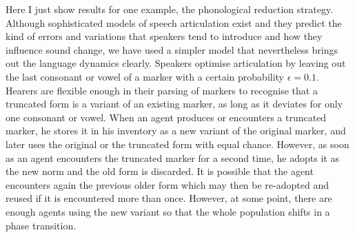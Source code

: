 Here I just show results for one example, the phonological reduction strategy. 
 Although sophisticated models of speech articulation
exist and they predict the kind of errors and variations that speakers tend to introduce and 
how they influence sound change, we have used a simpler model that nevertheless brings out the language dynamics
clearly. Speakers optimise articulation by leaving out the last consonant or vowel of a marker with a certain probability $\epsilon=0.1$. 
Hearers are flexible enough in their parsing of markers to 
recognise that a truncated form is a variant of an existing marker, as long as it deviates 
for only one consonant or vowel.
When an agent produces or encounters a truncated marker, he stores it in his inventory as a new variant of the original 
marker, and later uses the original or the truncated form with equal chance. 
However, as soon as an agent encounters the truncated marker for a second time, he adopts it as the 
new norm and the old form is discarded. 
It is possible that the agent encounters again the previous older form which may then be re-adopted and reused if it is encountered 
more than once. However, at some point, there are enough agents using the new variant so that the whole population shifts in a phase transition. 

